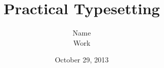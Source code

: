\documentclass[11pt,a4paper,oneside]{report}
\begin{document}
\title{Practical Typesetting}
\author{Name\\ Work}
\date{October 29, 2013}
\maketitle
\end{document}
